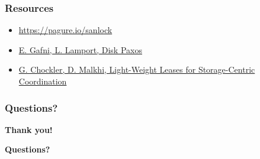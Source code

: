 \documentclass[10pt,utf8]{beamer}
\begin{document}
\begin{frame}
    \frametitle{Resources}
    \begin{itemize}
    \item \small \color{blue}\url{https://pagure.io/sanlock}\color{black}
     \item \color{blue}\href{http://lamport.azurewebsites.net/pubs/disk-paxos-disc.pdf}{E. Gafni, L. Lamport, Disk Paxos}\color{black}
     \item \color{blue}\href{https://groups.csail.mit.edu/tds/papers/Chockler/TR934.ps}{G. Chockler, D. Malkhi, Light-Weight Leases for Storage-Centric Coordination}\color{black}
    \end{itemize}
\end{frame}

\begin{frame}
    \frametitle{Questions?}
    \centering
     \textbf{\Huge{Thank you!}}
    
    \vspace{1.5cm}
    
    \textbf{\Huge{Questions?}}
\end{frame}
\end{document}
